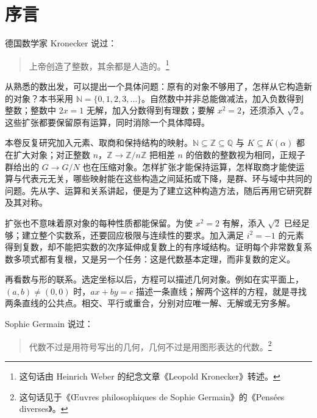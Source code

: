 \chapter*{序言}


德国数学家 Kronecker 说过：
\begin{quote}
	上帝创造了整数，其余都是人造的。\footnote{这句话由 Heinrich Weber 的纪念文章《Leopold Kronecker》\cite{Weber1893Kronecker}转述。}
\end{quote}

从熟悉的数出发，可以提出一个具体问题：原有的对象不够用了，怎样从它构造新的对象？本书采用 \(\mathbb N=\{0,1,2,3,\ldots\}\)。自然数中并非总能做减法，加入负数得到整数；整数中 \(2x=1\) 无解，加入分数得到有理数；要解 \(x^2=2\)，还须添入 \(\sqrt2\)。这些扩张都要保留原有运算，同时消除一个具体障碍。

\ProseParagraphBreak
本卷反复研究加入元素、取商和保持结构的映射。\(\mathbb N\subseteq\mathbb Z\subseteq\mathbb Q\) 与 \(K\subseteq K(\alpha)\) 都在扩大对象；对正整数 \(n\)，\(\mathbb Z\rightarrow\mathbb Z/n\mathbb Z\) 把相差 \(n\) 的倍数的整数视为相同，正规子群给出的 \(G\rightarrow G/N\) 也在压缩对象。怎样扩张才能保持运算，怎样取商才能使运算与代表元无关，哪些映射能在这些构造之间延拓或下降，是群、环与域中共同的问题。先从字、运算和关系讲起，便是为了建立这种构造方法，随后再用它研究群及其对称。

\ProseParagraphBreak
扩张也不意味着原对象的每种性质都能保留。为使 \(x^2=2\) 有解，添入 \(\sqrt2\) 已经足够；建立整个实数系，还要回应极限与连续性的要求。加入满足 \(i^2=-1\) 的元素得到复数，却不能把实数的次序延伸成复数上的有序域结构。证明每个非常数复系数多项式都有复根，又是另一个任务：这是代数基本定理，而非复数的定义。

\ProseParagraphBreak
再看数与形的联系。选定坐标以后，方程可以描述几何对象。例如在实平面上，\((a,b)\ne(0,0)\) 时，\(ax+by=c\) 描述一条直线；解两个这样的方程，就是寻找两条直线的公共点。相交、平行或重合，分别对应唯一解、无解或无穷多解。

\ProseParagraphBreak
Sophie Germain 说过：
\begin{quote}
	代数不过是用符号写出的几何，几何不过是用图形表达的代数。\footnote{这句话见于《Œuvres philosophiques de Sophie Germain》的《Pensées diverses》\cite[Pensées diverses]{Germain1896}。}
\end{quote}

